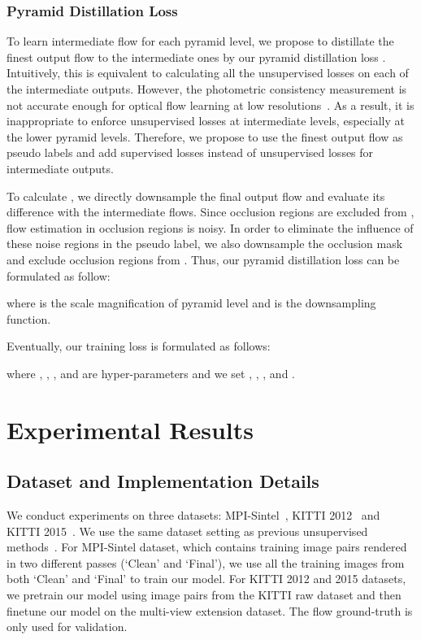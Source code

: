 \documentclass[final]{cvpr}
\begin{document}
\subsubsection{Pyramid Distillation Loss}\label{sec:algo_pyramid_distillation_loss}
To learn intermediate flow for each pyramid level, we propose to distillate the finest output flow to the intermediate ones by our pyramid distillation loss .
Intuitively, this is equivalent to calculating all the unsupervised losses on each of the intermediate outputs. However, the photometric consistency measurement is not accurate enough for optical flow learning at low resolutions~\cite{jonschkowski2020matters}. As a result, it is inappropriate to enforce unsupervised losses at intermediate levels, especially at the lower pyramid levels. Therefore, we propose to use the finest output flow as pseudo labels and add supervised losses instead of unsupervised losses for intermediate outputs. 

To calculate , we directly downsample the final output flow and evaluate its difference with the intermediate flows. Since occlusion regions are excluded from , flow estimation in occlusion regions is noisy. In order to eliminate the influence of these noise regions in the pseudo label, we also downsample the occlusion mask  and exclude occlusion regions from . Thus, our pyramid distillation loss can be formulated as follow:

where  is the scale magnification of pyramid level  and  is the downsampling function. 

Eventually, our training loss  is formulated as follows: 

where , , ,  and  are hyper-parameters and we set , , ,  and . 


\section{Experimental Results}\label{sec:results}
\subsection{Dataset and Implementation Details}\label{sec:Datasets}
We conduct experiments on three datasets: MPI-Sintel~\cite{Butler2012}, KITTI 2012~\cite{KITTI_2012} and KITTI 2015~\cite{KITTI_2015}. We use the same dataset setting as previous unsupervised methods~\cite{liu2020learning,jonschkowski2020matters}. 
For MPI-Sintel dataset, which contains  training image pairs rendered in two different passes (`Clean' and `Final'), we use all the training images from both `Clean' and `Final' to train our model. For KITTI 2012 and 2015 datasets, we pretrain our model using  image pairs from the KITTI raw dataset and then finetune our model on the multi-view extension dataset. The flow ground-truth is only used for validation. 
\end{document}
